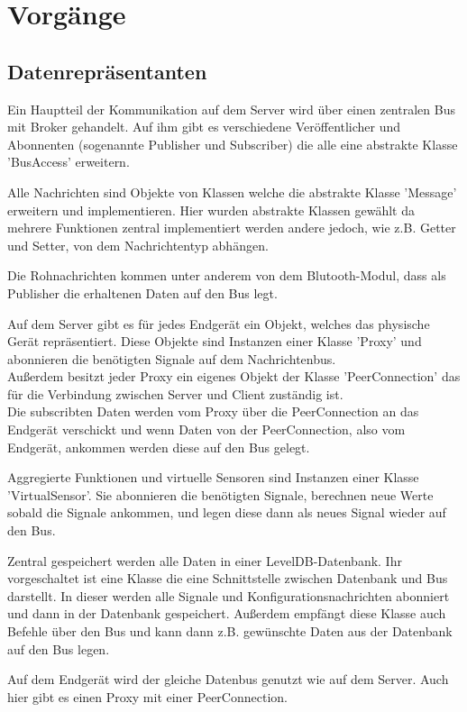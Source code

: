 \documentclass[entwurf.tex]{subfiles}
\begin{document}
\chapter{Vorgänge}
\section{Datenrepräsentanten}
Ein Hauptteil der Kommunikation auf dem Server wird über einen zentralen Bus mit Broker gehandelt. Auf ihm gibt es verschiedene Veröffentlicher und Abonnenten (sogenannte Publisher und Subscriber) die alle  eine abstrakte Klasse 'BusAccess' erweitern.

Alle Nachrichten sind Objekte von Klassen welche die abstrakte Klasse 'Message' erweitern und implementieren. Hier wurden abstrakte Klassen gewählt da mehrere Funktionen zentral implementiert werden andere jedoch, wie z.B. Getter und Setter, von dem Nachrichtentyp abhängen.  

Die Rohnachrichten kommen unter anderem von dem Blutooth-Modul, dass als Publisher die erhaltenen Daten auf den Bus legt.

Auf dem Server gibt es für jedes Endgerät ein Objekt, welches das physische Gerät repräsentiert. Diese Objekte sind Instanzen einer Klasse 'Proxy' und abonnieren die benötigten Signale auf dem Nachrichtenbus. \\
Außerdem besitzt jeder Proxy ein eigenes Objekt der Klasse 'PeerConnection' das für die Verbindung zwischen Server und Client zuständig ist. \\
Die subscribten Daten werden vom Proxy über die PeerConnection an das Endgerät verschickt und wenn Daten von der PeerConnection, also vom Endgerät, ankommen werden diese auf den Bus gelegt.

Aggregierte Funktionen und virtuelle Sensoren sind Instanzen einer Klasse 'VirtualSensor'. Sie abonnieren die benötigten Signale, berechnen neue Werte sobald die Signale ankommen, und legen diese dann als neues Signal wieder auf den Bus. 

Zentral gespeichert werden alle Daten in einer LevelDB-Datenbank. Ihr vorgeschaltet ist eine Klasse die eine Schnittstelle zwischen Datenbank und Bus darstellt. In dieser werden alle Signale und Konfigurationsnachrichten abonniert und dann in der Datenbank gespeichert. Außerdem empfängt diese Klasse auch Befehle über den Bus und kann dann z.B. gewünschte Daten aus der Datenbank auf den Bus legen.

Auf dem Endgerät wird der gleiche Datenbus genutzt wie auf dem Server. Auch hier gibt es einen Proxy mit einer PeerConnection.
\end{document}
